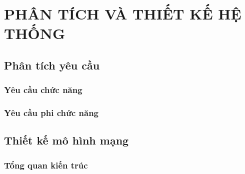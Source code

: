 \section{PHÂN TÍCH VÀ THIẾT KẾ HỆ THỐNG}\label{sec:phan_tich_thiet_ke}

\subsection{Phân tích yêu cầu}

\subsubsection{Yêu cầu chức năng}

\subsubsection{Yêu cầu phi chức năng}

\subsection{Thiết kế mô hình mạng}

\subsubsection{Tổng quan kiến trúc}
%
%

